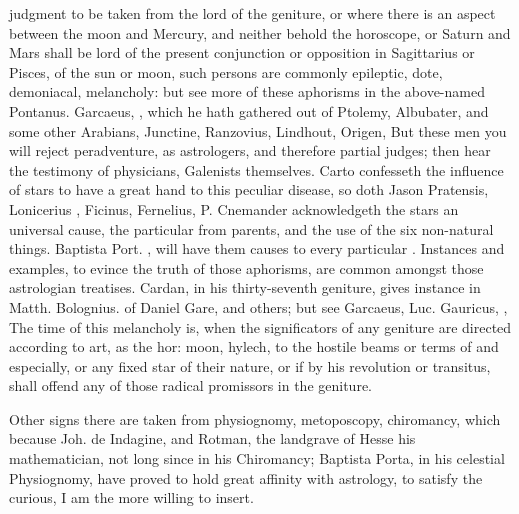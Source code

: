 judgment to be taken from the lord of the geniture, or where there is an aspect
between the moon and Mercury, and neither behold the horoscope, or Saturn and
Mars shall be lord of the present conjunction or opposition in Sagittarius or
Pisces, of the sun or moon, such persons are commonly epileptic, dote,
demoniacal, melancholy: but see more of these aphorisms in the above-named
Pontanus. Garcaeus, , which he hath gathered out of Ptolemy,
Albubater, and some other Arabians, Junctine, Ranzovius, Lindhout, Origen,
\etc{} But these men you will reject peradventure, as astrologers, and
therefore partial judges; then hear the testimony of physicians, Galenists
themselves. Carto confesseth the influence of stars to
have a great hand to this peculiar disease, so doth Jason Pratensis, Lonicerius
, Ficinus, Fernelius, \etc{}
P. Cnemander acknowledgeth the stars an universal cause,
the particular from parents, and the use of the six non-natural things.
Baptista Port. , will have them
causes to every particular . Instances and examples, to evince
the truth of those aphorisms, are common amongst those astrologian treatises.
Cardan, in his thirty-seventh geniture, gives instance in Matth. Bolognius.
 of
Daniel Gare, and others; but see Garcaeus,  Luc.
Gauricus, , \etc{} The time of this
melancholy is, when the significators of any geniture are directed according to
art, as the hor: moon, hylech, \etc{} to the hostile beams or terms of \saturn{} and \mars{}
especially, or any fixed star of their nature, or if \saturn{} by his revolution or
transitus, shall offend any of those radical promissors in the geniture.

Other signs there are taken from physiognomy, metoposcopy, chiromancy, which
because Joh. de Indagine, and Rotman, the landgrave of Hesse his mathematician,
not long since in his Chiromancy; Baptista Porta, in his celestial Physiognomy,
have proved to hold great affinity with astrology, to satisfy the curious, I am
the more willing to insert.


